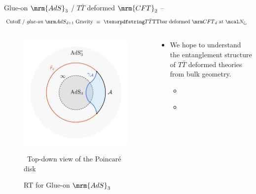 \documentclass[
	10pt
	,noamsthm
]{beamer}
\newcommand{\TTbar}{\texorpdfstring{\ensuremath{T\bar{T}}}{TTbar}\xspace}
\begin{document}
\begin{frame}{Glue-on $\mrm{AdS}_3$ / \TTbar deformed $\mrm{CFT}_2$}{%
	\textcite{Apolo:2023vnm} -- 
}
\vspace{-2\baselineskip}
\begin{equation*}
\stateGlueon
\end{equation*}
\vspace{-1.3\baselineskip}
\begin{columns}
\begin{column}{.37\textwidth}
\begin{figure}[!h]
	\centering
	\includegraphics[width=\linewidth]{img/RT-AdS.pdf}
	\vspace{-1.5\baselineskip}
	\caption{RT for Glue-on $\mrm{AdS}_3$}
	
	\vspace{-.3\baselineskip}
	\scriptsize\, Top-down view of the Poincar\'e disk
\end{figure}
\end{column}
\hspace{-1em}
\begin{column}{.71\textwidth}
\begin{itemize}

\item We hope to understand the entanglement structure of \TTbar deformed theories from bulk geometry. \pause
	\begin{itemize}
	\item \textcite{Donnelly:2018bef,Lewkowycz:2019xse}
	\item \textcite{He:2023xnb,He:2023wko,Tian:2023fgf,Hou:2023ytl}
	\end{itemize}
\end{itemize}
\end{column}
\end{columns}
\end{frame}
\end{document}
